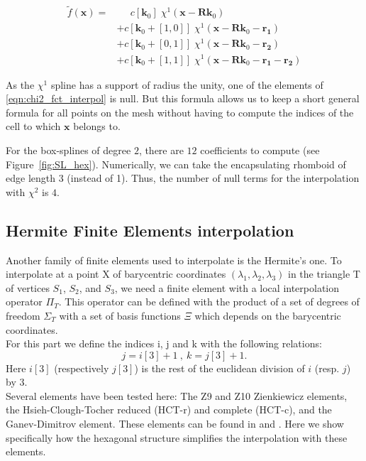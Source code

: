 \documentclass[proc]{edpsmath}
\begin{document}
\begin{align}
\label{eqn:chi2_fct_interpol}
\tilde{f}(\mathbf{x}) =& \;\;\;\;\; c[\mathbf{k}_0] \; \chi^1(\mathbf{x} - \mathbf{R}\mathbf{k}_0) \nonumber\\
	&+ c[\mathbf{k}_0 +[1,0]]\; \chi^1(\mathbf{x} - \mathbf{R}\mathbf{k}_0 - \mathbf{r_1}) \nonumber\\
	&+ c[\mathbf{k}_0 +[0,1]]\; \chi^1(\mathbf{x} - \mathbf{R}\mathbf{k}_0 - \mathbf{r_2}) \nonumber\\
	&+ c[\mathbf{k}_0 +[1,1]]\; \chi^1(\mathbf{x} - \mathbf{R}\mathbf{k}_0 - \mathbf{r_1} - \mathbf{r_2})
\end{align}

\rmrk  As the $\chi^1$ spline has a support of radius the unity, one of the elements of \eqref{eqn:chi2_fct_interpol} is null. But this formula allows us to keep a short general formula for all points on the mesh without having to compute the indices of the cell to which $\mathbf{x}$ belongs to.

\rmrk For the box-splines of degree $2$, there are $12$ coefficients to compute (see Figure~\ref{fig:SL_hex}). Numerically, we can take the encapsulating rhomboid of edge length $3$ (instead of 1). Thus, the number of null terms for the interpolation with $\chi^2$ is $4$.


\subsection{Hermite Finite Elements interpolation}

Another family of finite elements used to interpolate is the Hermite's one.
To interpolate at a point X of barycentric coordinates $(\lambda_1,\lambda_2,\lambda_3)$ in the triangle T of vertices $S_1$, $S_2$, and $S_3$, we need a finite element with a local interpolation operator $\Pi_T $. This operator can be defined with the product of a set of degrees of freedom $\Sigma_T$ with a set of basis functions $\Xi$ which depends on the barycentric coordinates.\\
For this part we define the indices i, j and k with the following relations:
\begin{equation*}
j=i[3]+1 ~,~ k=j[3]+1.
\end{equation*}  
Here $i[3]$ (respectively $j[3]$) is the rest of the euclidean division of $i$ (resp. $j$) by $3$.\\

Several elements have been tested here:
The Z9 and Z10 Zienkiewicz elements, the Hsieh-Clough-Tocher reduced (HCT-r) and complete (HCT-c), and the Ganev-Dimitrov element. These elements can be found in \cite{z} and \cite{b1} . Here we show specifically how the hexagonal structure simplifies the interpolation with these elements.\\
\end{document}

